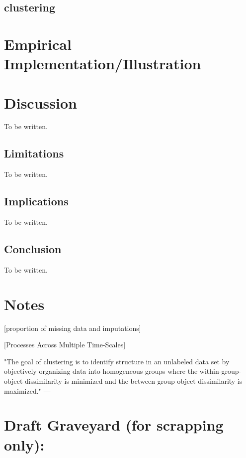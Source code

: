 \documentclass[man, 12pt, a4paper]{apa7}
\theoremstyle{break}
\theoremstyle{plain}
\begin{document}
\subsection{clustering}


\section{Empirical Implementation/Illustration}



\section{Discussion}
To be written.

\subsection{Limitations}
To be written.

\subsection{Implications}
To be written.


\subsection{Conclusion}
To be written.




\section{Notes}

\citep[][]{Madley-Dowd2019} [proportion of missing data and imputations]

\citep[e.g., see][]{Ram2014} [Processes Across Multiple Time-Scales]

"The goal of clustering is to identify structure in an unlabeled data set by objectively organizing data into homogeneous groups where the within-group-object dissimilarity is minimized and the between-group-object dissimilarity is maximized." --- \citep[][p.1857]{liao2005}

\section{Draft Graveyard (for scrapping only):}
\end{document}

